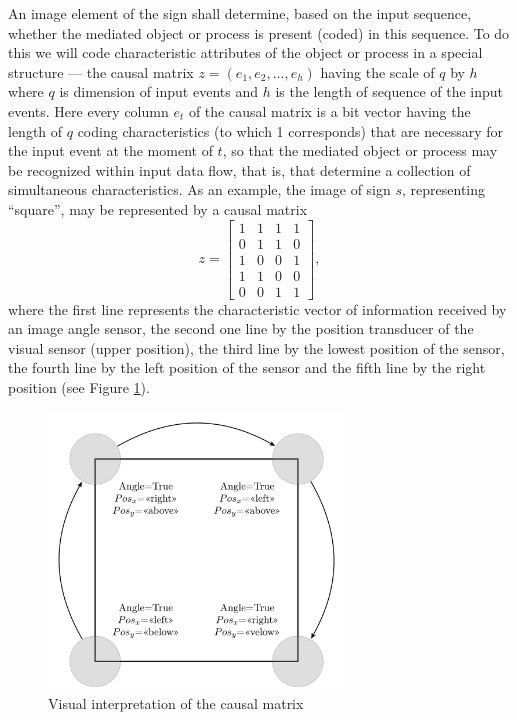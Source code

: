 \documentclass[review]{elsarticle}
\begin{document}
An image element of the sign shall determine, based on the input sequence,  whether the mediated object or process is present (coded) in this sequence. To do this we will code characteristic attributes of the object or process in a special structure --- the causal matrix $z=(e_1,e_2,\dots,e_h)$ having the scale of $q$ by $h$ where $q$ is dimension of input events and $h$ is the length of sequence of the input events. Here every column $e_t$ of the causal matrix is a bit vector having the length of $q$ coding characteristics (to which 1 corresponds) that are necessary for the input event at the moment of $t$, so that the mediated object or process may be recognized within input data flow, that is, that determine a collection of simultaneous characteristics. As an example, the image of sign $s$, representing ``square'', may be represented by a causal matrix 
\[
	z=\begin{bmatrix}
	1&1&1&1\\
	0&1&1&0\\
	1&0&0&1\\
	1&1&0&0\\
	0&0&1&1
	\end{bmatrix},
\]
where the first line represents the characteristic vector of information received by an image angle sensor, the second one line by the position transducer of the visual sensor (upper position), the third line by the lowest position of the sensor, the fourth line by the left position of the sensor and the fifth line by the right position (see Figure \ref{fig:square}).

\begin{figure}
	\centering
	\includegraphics[width=0.7\textwidth]{square_en}
	\caption{Visual interpretation of the causal matrix}		
	\label{fig:square}
\end{figure}
\end{document}
